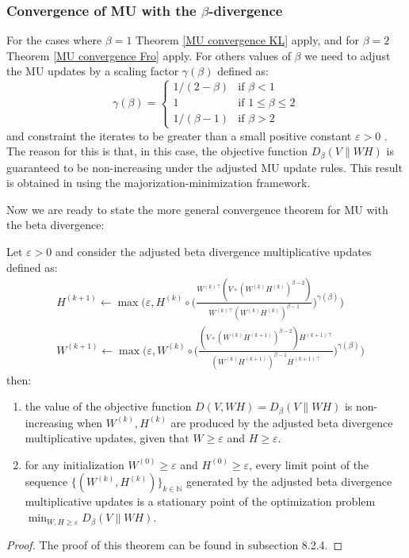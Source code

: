 \subsubsection{Convergence of MU with the $\beta$-divergence}
For the cases where $\beta = 1$ Theorem \ref{MU convergence KL} apply, and for $\beta = 2$ Theorem \ref{MU convergence Fro} apply.
For others values of $\beta$ we need to adjust the MU updates by a scaling factor $\gamma(\beta)$ \cite{févotte2011algorithmsnonnegativematrixfactorization} defined as:
\begin{equation}
    \gamma(\beta) =
    \begin{cases}
        1/(2 - \beta) & \text{if } \beta < 1 \\
        1 & \text{if } 1 \leq \beta \leq 2 \\
        1/(\beta - 1) & \text{if } \beta > 2
    \end{cases}
\end{equation}
and constraint the iterates to be greater than a small positive constant $\varepsilon > 0$ \cite{takahashi2014global}.
The reason for this is that, in this case, the objective function $D_{\beta}(V \| WH)$ is guaranteed to be non-increasing under the adjusted MU update rules.
This result is obtained in \cite{févotte2011algorithmsnonnegativematrixfactorization} using the majorization-minimization framework.
\par
Now we are ready to state the more general convergence theorem for MU with the beta divergence:
\begin{theorem}
    Let $\varepsilon > 0$ and consider the adjusted beta divergence multiplicative updates defined as:
    \begin{align}
        &H^{(k + 1)} \leftarrow \max\Bigg(\varepsilon, 
        H^{(k)} \circ \Big(\frac{W^{(k) \top} (V \circ (W^{(k)} H^{(k)})^{\beta - 2})}{W^{(k) \top} (W^{(k)} H^{(k)})^{\beta - 1}}\Big)^{\gamma(\beta)}\Bigg)
        \\
        &W^{(k + 1)} \leftarrow \max\Bigg(\varepsilon, 
        W^{(k)} \circ \Big(\frac{(V \circ (W^{(k)}H^{(k+1)})^{\beta - 2}) H^{(k+1) \top}}{(W^{(k)}H^{(k+1)})^{\beta - 1} H^{(k+1) \top}}\Big)^{\gamma(\beta)}\Bigg)
    \end{align}
then: 
\begin{enumerate}
    \item the value of the objective function $D(V, WH) = D_{\beta}(V \| WH)$ is non-increasing when $W^{(k)}, H^{(k)}$ are produced by the adjusted beta divergence multiplicative updates, given that $W \geq \varepsilon$ and $H \geq \varepsilon$.
    \item for any initialization $W^{(0)} \geq \varepsilon$ and $H^{(0)} \geq \varepsilon$, every limit point of the sequence $\{(W^{(k)}, H^{(k)})\}_{k \in \mathbb{N}}$ generated by the adjusted beta divergence multiplicative updates is a stationary point of the optimization problem $\min_{W,H \geq \varepsilon} D_{\beta}(V \| WH)$.
\end{enumerate}
\end{theorem}
\begin{proof}
    The proof of this theorem can be found in \cite{gillis2020nonnegative} subsection 8.2.4.
\end{proof}
